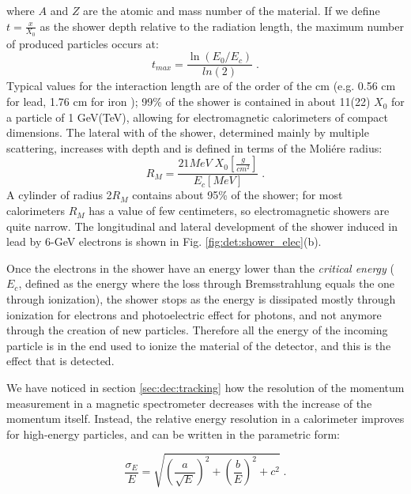 where $A$ and $Z$ are the atomic and mass number of the material. If we define $t = \frac{x}{X_0}$ as the shower depth relative to the radiation length, the maximum number of produced particles occurs at:
\begin{equation}
t_{max} = \frac{\ln\left(E_0/E_c\right)}{ln\left(2\right)} \;.
\end{equation}
Typical values for the interaction length are of the order of the cm (e.g. 0.56 cm for lead, 1.76 cm for iron \cite{Patrignani:2016xqp}); 99\% of the shower is contained in about 11(22) $X_0$ for a particle of 1 GeV(TeV), allowing for electromagnetic calorimeters of compact dimensions. 
The lateral with of the shower, determined mainly by multiple scattering, increases with depth and is defined in terms of the Moli\'ere radius:
\begin{equation}
R_M = \frac{21 MeV \; X_0[\frac{g}{cm^2}]}{E_c [MeV]} \; .
\end{equation}
A cylinder of radius 2$R_M$ contains about 95\% of the shower; for most calorimeters $R_M$ has a value of few centimeters, so electromagnetic showers are quite narrow. The longitudinal and lateral development of the shower induced in lead by 6-GeV electrons is shown in Fig. \ref{fig:det:shower_elec}(b).

Once the electrons in the shower have an energy lower than the \textit{critical energy} ($E_c$, defined as the energy where the loss through Bremsstrahlung equals the one through ionization), the shower stops as the energy is dissipated mostly through ionization for electrons and photoelectric effect for photons, and not anymore through the creation of new particles. Therefore all the energy of the incoming particle is in the end used to ionize the material of the detector, and this is the effect that is detected.


We have noticed in section \ref{sec:dec:tracking} how the resolution of the momentum measurement in a magnetic spectrometer decreases with the increase of the momentum itself. Instead, the relative energy resolution in a calorimeter improves for high-energy particles, and can be written in the parametric form:

\begin{equation}
\frac{\sigma_E}{E} = \sqrt{\left(\frac{a}{\sqrt{E}} \right)^2 + \left( \frac{b}{E} \right)^2 + c^2 } \; .
\end{equation}

